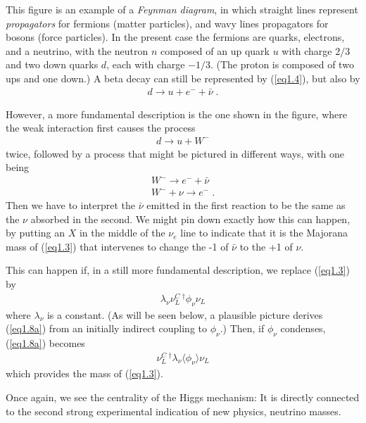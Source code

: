 \documentclass[12pt]{iopart}
\begin{document}
This figure is an example of a \textit{Feynman diagram}, in which straight lines represent \textit{propagators} for fermions (matter particles), and wavy lines propagators for bosons (force particles). In the present case the fermions are quarks, electrons, and a neutrino, with the neutron $n$ composed of an up quark $u$ with charge $2/3$ and two down quarks $d$, each with charge $-1/3$.  (The proton is composed of two ups and one down.) A beta decay can still be represented by (\ref{eq1.4}), but also by 
\begin{eqnarray}
d \rightarrow u + e^- + \bar{\nu}
\label{eq1.6} \; .
\end{eqnarray}

However, a more fundamental description is the one shown in the figure, where the weak interaction first causes the process
\begin{eqnarray}
d \rightarrow u + W^-
\label{eq1.7} 
\end{eqnarray}
twice, followed by a process that might be pictured in different ways, with one being
\begin{eqnarray}
W^- \rightarrow e^-  + \bar{\nu} \label{eq1.7a}  \\
W^- + \nu \rightarrow e^-  \label{eq1.7b}  \; .
\end{eqnarray}
Then we have to interpret the $\bar{\nu}$ emitted in the first reaction to be the same as the $\nu$ absorbed in the second. 
We might pin down exactly how this can happen, by putting an $X$ in the middle of the $\nu_e$ line to indicate that it is the Majorana mass of (\ref{eq1.3}) that intervenes to change the -1 of $\bar{\nu}$ to the +1 of $\nu$. 

This can happen if, in a still more fundamental description, we replace (\ref{eq1.3}) by
\begin{eqnarray}
\lambda_{\nu} \nu_L^C \, ^{\dag}  \phi_{\nu} \nu_L 
\label{eq1.8a}
\end{eqnarray}
where $\lambda_{\nu}$ is a constant. (As will be seen below, a plausible picture derives (\ref{eq1.8a}) from an initially indirect coupling to $\phi_{\nu}$.) Then, if $\phi_{\nu}$ condenses, (\ref{eq1.8a}) becomes
\begin{eqnarray}
\nu_L^C \, ^{\dag}  \lambda_{\nu} \langle  \phi_{\nu} \rangle \nu_L 
\label{eq1.8}
\end{eqnarray}
which provides the mass of (\ref{eq1.3}). 

Once again, we see the centrality of the Higgs mechanism: It is directly connected to the second strong experimental indication of new physics, neutrino masses.
\end{document}

